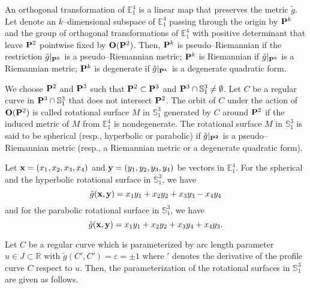 \documentclass{amsart}
\theoremstyle{definition}
\numberwithin{equation}{section}
\begin{document}
An orthogonal transformation of $\mathbb{E}^4_1$ is 
a linear map that preserves the metric $\tilde{g}$. 
Let denote an $k$--dimensional subspace of $\mathbb{E}^4_1$ passing through the origin by ${\bf P}^k$ 
and the group of 
orthogonal transformations of $\mathbb{E}^4_1$ with positive determinant that leave ${\bf P}^2$ pointwise fixed
by ${\bf O}({\bf P}^2)$. 
Then, ${\bf P}^k$ is pseudo--Riemannian if the restriction
$\tilde{g}|_{{\bf P}^k}$ is a pseudo--Riemannian metric; 
${\bf P}^k$ is Riemannian if $\tilde{g}|_{{\bf P}^k}$ is a Riemannian metric; 
${\bf P}^k$ is degenerate if $\tilde{g}|_{{\bf P}^k}$ is a degenerate quadratic form.  

We choose ${\bf P}^2$ and ${\bf P}^3$ 
such that ${\bf P}^2\subset {\bf P}^3$ and 
${\bf P}^3\cap\mathbb{S}^3_1\neq\emptyset$. 
Let $C$ be a regular curve in ${\bf P}^3\cap\mathbb{S}^3_1$
that does not intersect ${\bf P}^2$.
The orbit of $C$ under the action of ${\bf O}({\bf P}^2)$ is called rotational surface $M$ in $\mathbb{S}^3_1$ generated by 
$C$ around ${\bf P}^2$
if the induced metric of $M$ from $\mathbb{E}^4_1$ is nondegenerate. The rotational surface $M$ in $\mathbb{S}^3_1$ is said to be spherical
(resp., hyperbolic or parabolic) if 
$\tilde{g}|_{\bf{P}^2}$
is a pseudo--Riemannian metric
(resp., a Riemannian metric or a degenerate  quadratic form).

Let ${\bf x}=(x_1,x_2,x_3,x_4)$ and 
${\bf y}=(y_1,y_2,y_3,y_4)$ be vectors in $\mathbb{E}^4_1$. For the spherical and the hyperbolic rotational surface
in $\mathbb{S}^3_1$, 
we have 
\begin{equation}
 \tilde{g}({\bf x}, {\bf y})=x_1y_1+x_2y_2+x_3y_3-x_4y_4   
\end{equation}
and for the parabolic rotational surface in $\mathbb{S}^3_1$, 
we have 
\begin{equation}
     \tilde{g}({\bf x},{\bf y})=x_1y_1+x_2y_2+x_3y_4+x_4y_3.  
\end{equation}

Let $C$ be a regular curve
which is parameterized by arc length parameter 
$u\in J\subset\mathbb{R}$ 
with $\tilde{g}(C', C')=\varepsilon=\pm 1$
where $\prime$ 
denotes the derivative of the profile curve 
$C$ respect to $u$. 
Then, the parameterization of the rotational surfaces in $\mathbb{S}^3_1$ are given as follows.
\end{document}
